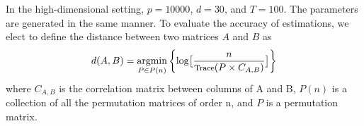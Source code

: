 \documentclass[fleqn,12pt]{article}
\newcommand{\argmin}{\operatornamewithlimits{argmin}}
\begin{document}
In the high-dimensional setting, $p = 10000$, $d = 30$, and $T = 100$. The parameters are generated in the same manner. To evaluate the accuracy of estimations, we elect to define the distance between two matrices $A$ and $B$ as
\begin{equation}\label{eq:distance}
d(A,B) = \argmin_{P\in P(n)}\left\{\log\bigl[\frac{n}{\text{\footnotesize Trace}(P\times C_{A,B})}\bigr]\right\}
\end{equation}
where $C_{A,B}$ is the correlation matrix between columns of A and B, $P(n)$ is a collection of all the permutation matrices of order n, and $P$ is a permutation matrix.
\end{document}
